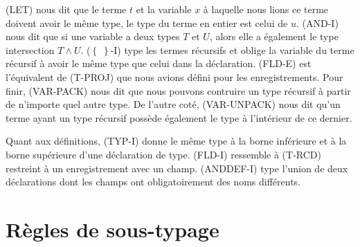(LET) nous dit que le terme $t$ et la variable $x$ à laquelle nous lions ce
terme doivent avoir le même type, le type du terme en entier est celui de $u$.
(AND-I) nous dit que si une variable a deux types $T$ et $U$, alors elle a
également le type intersection $T \wedge U$. ($\left\{ \; \right\}$-I) type les termes
récursifs et oblige la variable du terme récursif à avoir le même type que celui dans la déclaration.
(FLD-E) est l'équivalent de (T-PROJ) que nous avions défini pour les
enregistrements.
Pour finir, (VAR-PACK) nous dit que nous pouvons
contruire un type récursif à partir de n'importe quel autre type. De l'autre
coté, (VAR-UNPACK) nous dit qu'un terme ayant un type récursif possède également
le type à l'intérieur de ce dernier.

Quant aux définitions, (TYP-I) donne le même type à la borne inférieure et à la
borne supérieure d'une déclaration de type. (FLD-I) ressemble à (T-RCD)
restreint à un enregistrement avec un champ. (ANDDEF-I) type l'union de deux
déclarations dont les champs ont obligatoirement des noms différents.

\section{Règles de sous-typage}


